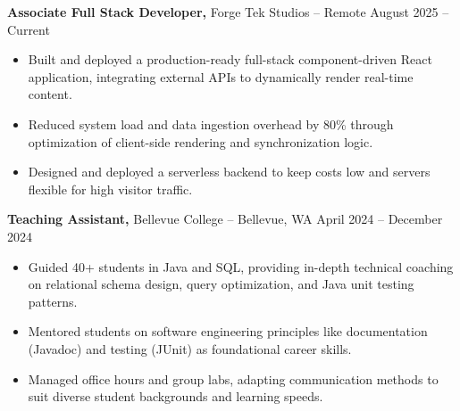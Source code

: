 \documentclass[11pt]{article}       %
\begin{document}
\textbf{Associate Full Stack Developer,} {Forge Tek Studios} -- Remote \hfill August 2025 -- Current 
\vspace{-9pt}
\begin{itemize}
  \item Built and deployed a production-ready full-stack component-driven React application, integrating external APIs to dynamically render real-time content.
  \item Reduced system load and data ingestion overhead by 80\% through optimization of client-side rendering and synchronization logic.
  \item Designed and deployed a serverless backend to keep costs low and servers flexible for high visitor traffic.
\end{itemize}

\textbf{Teaching Assistant,} {Bellevue College} -- Bellevue, WA \hfill April 2024 -- December 2024 \\
\vspace{-9pt}
\begin{itemize}
  \item Guided 40+ students in Java and SQL, providing in-depth technical coaching on relational schema design, query optimization, and Java unit testing patterns.
  \item Mentored students on software engineering principles like documentation (Javadoc) and testing (JUnit) as foundational career skills.
  \item Managed office hours and group labs, adapting communication methods to suit diverse student backgrounds and learning speeds.
\end{itemize}

\end{document}
